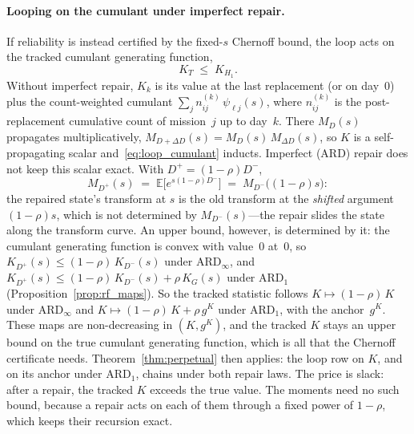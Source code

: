 \documentclass[11pt,a4paper]{article}
\theoremstyle{plain}
\theoremstyle{definition}
\theoremstyle{remark}
\begin{document}
\paragraph{Looping on the cumulant under imperfect repair.}
If reliability is instead certified by the fixed-$s$ Chernoff bound, the loop acts on the tracked cumulant generating function,
\begin{equation}\label{eq:loop_cumulant}
  K_T \;\le\; K_{H_1}.
\end{equation}
Without imperfect repair, $K_k$ is its value at the last replacement (or on day~$0$) plus the count-weighted cumulant $\sum_j n^{(k)}_{ij}\,\psi_{\ell j}(s)$, where $n^{(k)}_{ij}$ is the post-replacement cumulative count of mission~$j$ up to day~$k$.
There $M_{D}(s)$ propagates multiplicatively, $M_{D + \Delta D}(s) = M_D(s)\,M_{\Delta D}(s)$, so $K$ is a self-propagating scalar and~\eqref{eq:loop_cumulant} inducts.
Imperfect (ARD) repair does not keep this scalar exact. With $D^+ = (1-\rho)D^-$,
\begin{equation}\label{eq:mgf_rescale}
  M_{D^+}(s) \;=\; \mathbb{E}\big[e^{s(1-\rho)D^-}\big] \;=\; M_{D^-}\big((1-\rho)s\big):
\end{equation}
the repaired state's transform at $s$ is the old transform at the \emph{shifted} argument $(1-\rho)s$, which is not determined by $M_{D^-}(s)$---the repair slides the state along the transform curve.
An upper bound, however, is determined by it: the cumulant generating function is convex with value~$0$ at~$0$, so $K_{D^+}(s) \le (1-\rho)\,K_{D^-}(s)$ under $\text{ARD}_\infty$, and $K_{D^+}(s) \le (1-\rho)\,K_{D^-}(s) + \rho\,K_G(s)$ under $\text{ARD}_1$ (Proposition~\ref{prop:rf_maps}).
So the tracked statistic follows $K \mapsto (1-\rho)\,K$ under $\text{ARD}_\infty$ and $K \mapsto (1-\rho)\,K + \rho\,g^K$ under $\text{ARD}_1$, with the anchor~$g^K$.
These maps are non-decreasing in $(K, g^K)$, and the tracked $K$ stays an upper bound on the true cumulant generating function, which is all that the Chernoff certificate needs.
Theorem~\ref{thm:perpetual} then applies: the loop row on $K$, and on its anchor under $\text{ARD}_1$, chains under both repair laws.
The price is slack: after a repair, the tracked $K$ exceeds the true value.
The moments need no such bound, because a repair acts on each of them through a fixed power of $1-\rho$, which keeps their recursion exact.
\end{document}
